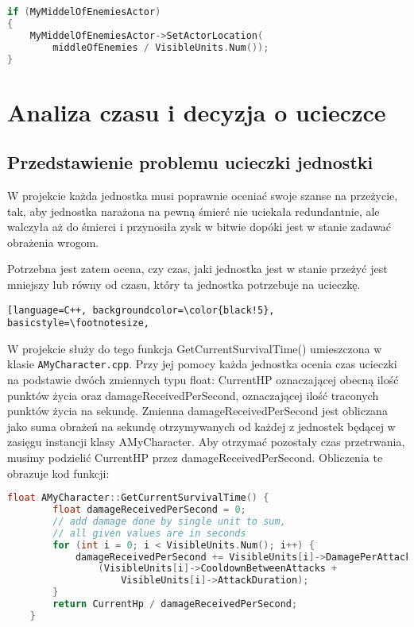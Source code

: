 \documentclass[12pt]{report}
\begin{document}
\begin{lstlisting}[language=C++, backgroundcolor=\color{black!5}, basicstyle=\footnotesize, caption=Ustawienie pozycji komponentu MyMiddelOfEnemiesActor w funkcji GetMiddleOfEnemies();]
if (MyMiddelOfEnemiesActor)
{
	MyMiddelOfEnemiesActor->SetActorLocation(
	    middleOfEnemies / VisibleUnits.Num());
}
\end{lstlisting}

\section{Analiza czasu i decyzja o ucieczce}
\subsection{Przedstawienie problemu ucieczki jednostki}
W projekcie każda jednostka musi poprawnie oceniać swoje szanse na przeżycie, tak, aby jednostka narażona na pewną śmierć nie uciekała redundantnie, ale walczyła aż do śmierci i przynosiła zysk w bitwie dopóki jest w stanie zadawać obrażenia wrogom.

Potrzebna jest zatem ocena, czy czas, jaki jednostka jest w stanie przeżyć jest mniejszy lub równy od czasu, który ta jednostka potrzebuje na ucieczkę.

\begin{lstlisting}[language=C++, backgroundcolor=\color{black!5}, basicstyle=\footnotesize, 

\end{lstlisting}


W projekcie służy do tego funkcja GetCurrentSurvivalTime() umieszczona w klasie \texttt{AMyCharacter.cpp}. Przy jej pomocy każda jednostka ocenia czas ucieczki na podstawie dwóch zmiennych typu float: CurrentHP oznaczającej obecną ilość punktów życia oraz damageReceivedPerSecond, oznaczającej ilość traconych punktów życia na sekundę. Zmienna damageReceivedPerSecond jest obliczana jako suma obrażeń na sekundę otrzymywanych od każdej z jednostek będącej w zasięgu instancji klasy AMyCharacter. Aby otrzymać pozostały czas przetrwania, musimy podzielić CurrentHP przez damageReceivedPerSecond. Obliczenia te obrazuje kod funkcji:

\begin{lstlisting}[language=C++, backgroundcolor=\color{black!5}, basicstyle=\footnotesize, caption=Funkcja GetCurrentSurvivalTime w klasie \texttt{AMyCharacter.cpp}.]
    float AMyCharacter::GetCurrentSurvivalTime() {
		float damageReceivedPerSecond = 0;
		// add damage done by single unit to sum, 
		// all given values are in seconds
		for (int i = 0; i < VisibleUnits.Num(); i++) { 
			damageReceivedPerSecond += VisibleUnits[i]->DamagePerAttack /
				(VisibleUnits[i]->CooldownBetweenAttacks + 
				    VisibleUnits[i]->AttackDuration);
		}
		return CurrentHp / damageReceivedPerSecond;
	}
\end{lstlisting}
\end{document}
